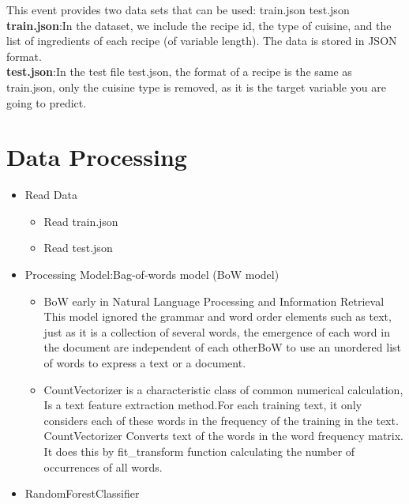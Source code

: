 This event provides two data sets that can be used: train.json  test.json\\
\textbf{train.json}:In the dataset, we include the recipe id, the type of cuisine, and the list of ingredients of each recipe (of variable length). The data is stored in JSON format. \\
\textbf{test.json}:In the test file test.json, the format of a recipe is the same as train.json, only the cuisine type is removed, as it is the target variable you are going to predict.



\section{Data Processing} \label{sec-method}
\begin{itemize}
  \item
  Read Data \\
  \begin{itemize}
  \item
  Read train.json
  \item
  Read test.json
  \end{itemize}
  \item
  Processing Model:Bag-of-words model (BoW model)\\
  \begin{itemize}
    \item 
    BoW early in Natural Language Processing and Information Retrieval 
    This model ignored the grammar and word order elements such as text, 
    just as it is a collection of several words, the emergence of each
     word in the document are independent of each otherBoW to use an 
     unordered list of words to express a text or a document.
  \end{itemize}
   \begin{itemize}
    \item
    CountVectorizer is a characteristic class of common numerical calculation,
    Is a text feature extraction method.For each training text, it only considers 
    each of these words in the frequency of the training in the text.
    CountVectorizer Converts text of the words in the word frequency matrix.
    It does this by fit_transform function calculating the number of occurrences of all words.
    \end{itemize}
  \item 
  RandomForestClassifier\\


\end{itemize}
